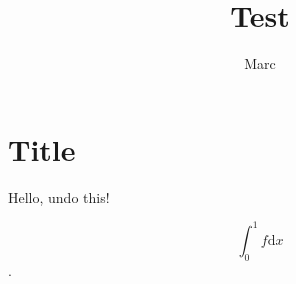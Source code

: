 \documentclass{article}
\begin{document}
\author{Marc}
\title{Test}
\maketitle

\section{Title}
\label{sec:title}
Hello, undo this!


$$ \int_0^1 f \mathrm{d}x $$.
\end{document}
